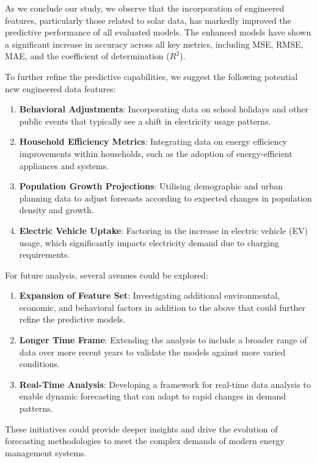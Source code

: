 \documentclass[
]{article}
\providecommand{\tightlist}{%
  \setlength{\itemsep}{0pt}\setlength{\parskip}{0pt}}
\begin{document}
As we conclude our study, we observe that the incorporation of
engineered features, particularly those related to solar data, has
markedly improved the predictive performance of all evaluated models.
The enhanced models have shown a significant increase in accuracy across
all key metrics, including MSE, RMSE, MAE, and the coefficient of
determination (\(R^2\)).

To further refine the predictive capabilities, we suggest the following
potential new engineered data features:

\begin{enumerate}
\def\labelenumi{\arabic{enumi}.}
\tightlist
\item
  \textbf{Behavioral Adjustments}: Incorporating data on school holidays
  and other public events that typically see a shift in electricity
  usage patterns.
\item
  \textbf{Household Efficiency Metrics}: Integrating data on energy
  efficiency improvements within households, such as the adoption of
  energy-efficient appliances and systems.
\item
  \textbf{Population Growth Projections}: Utilising demographic and
  urban planning data to adjust forecasts according to expected changes
  in population density and growth.
\item
  \textbf{Electric Vehicle Uptake}: Factoring in the increase in
  electric vehicle (EV) usage, which significantly impacts electricity
  demand due to charging requirements.
\end{enumerate}

For future analysis, several avenues could be explored:

\begin{enumerate}
\def\labelenumi{\arabic{enumi}.}
\tightlist
\item
  \textbf{Expansion of Feature Set}: Investigating additional
  environmental, economic, and behavioral factors in addition to the
  above that could further refine the predictive models.
\item
  \textbf{Longer Time Frame}: Extending the analysis to include a
  broader range of data over more recent years to validate the models
  against more varied conditions.
\item
  \textbf{Real-Time Analysis}: Developing a framework for real-time data
  analysis to enable dynamic forecasting that can adapt to rapid changes
  in demand patterns.
\end{enumerate}

These initiatives could provide deeper insights and drive the evolution
of forecasting methodologies to meet the complex demands of modern
energy management systems.
\end{document}
